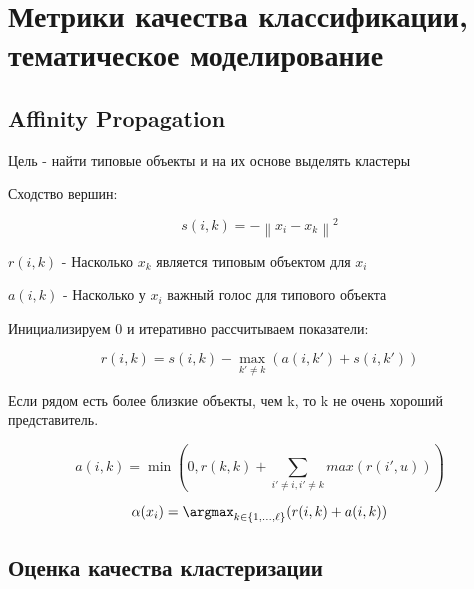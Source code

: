 \documentclass[a4paper, 12pt]{article}
\newcommand\norm[1]{\left\lVert#1\right\rVert}
\begin{document}
\section{Метрики качества классификации, 
тематическое моделирование}

\subsection{Affinity Propagation}

Цель - найти типовые объекты и на их основе выделять кластеры

Сходство вершин:

\[s(i, k) = -\norm{x_i - x_k}^2\]

$r(i, k)$ - Насколько $x_k$ является типовым объектом для $x_i$

$a(i, k)$ - Насколько у $x_i$ важный голос для типового объекта

Инициализируем 0 и итеративно рассчитываем показатели:

\[r(i, k) = s(i, k) - \max_{k' \neq k}(a(i, k') + s(i, k'))\]

Если рядом есть более близкие объекты, чем k, 
то k не очень хороший представитель.

\[a(i, k) = \min(0, r(k, k) + \sum_{i' \neq i, i' \neq k}max(r(i', u)))\]

\[\alpha(x_i) = \argmax_{k \in \{1, \ldots, \ell\}}(r(i, k) + a(i, k))\]

\subsection{Оценка качества кластеризации}
\end{document}
